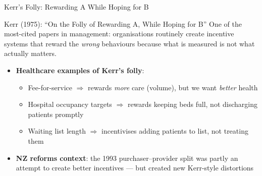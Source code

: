 \documentclass[aspectratio=169, 12pt]{beamer}
\begin{document}
\begin{frame}{Kerr's Folly: Rewarding A While Hoping for B}
  \begin{block}{Kerr (1975): ``On the Folly of Rewarding A, While Hoping for B''}
    One of the most-cited papers in management: organisations routinely create incentive
    systems that reward the \emph{wrong} behaviours because what is measured is not what
    actually matters.
  \end{block}
  \begin{itemize}
    \item \textbf{Healthcare examples of Kerr's folly}:
    \begin{itemize}
      \item Fee-for-service $\Rightarrow$ rewards \emph{more} care (volume), but we want \emph{better} health
      \item Hospital occupancy targets $\Rightarrow$ rewards keeping beds full, not discharging patients promptly
      \item Waiting list length $\Rightarrow$ incentivises adding patients to list, not treating them
    \end{itemize}
    \item \textbf{NZ reforms context}: the 1993 purchaser--provider split was partly an attempt
          to create better incentives --- but created new Kerr-style distortions
  \end{itemize}
\end{frame}

\end{document}
